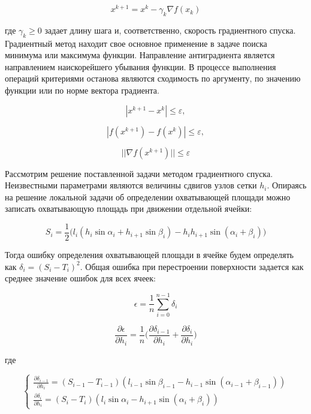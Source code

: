 \documentclass[
11pt,%
tightenlines,%
twoside,%
onecolumn,%
nofloats,%
nobibnotes,%
nofootinbib,%
superscriptaddress,%
noshowpacs,%
centertags]%
{revtex4}
\begin{document}
\begin{equation}
x^{k+1} = x^k - \gamma _k \nabla f(x_k)
\end{equation}

где $\gamma _k \geq 0$ задает длину шага и, соответственно, скорость градиентного спуска.
Градиентный метод находит свое основное применение в задаче поиска минимума или максимума функции.
Направление антиградиента является направлением наискорейшего убывания функции.
В процессе выполнения операций критериями останова являются сходимость по аргументу, по значению функции или по норме вектора градиента.

\begin{equation}
|x^{k+1} - x^k| \leq \varepsilon,
\end{equation}

\begin{equation}
|f(x^{k+1})- f(x^k)| \leq \varepsilon,
\end{equation}

\begin{equation}
||\nabla f(x^{k+1})|| \leq \varepsilon
\end{equation}


Рассмотрим решение поставленной задачи методом градиентного спуска.
Неизвестными параметрами являются величины сдвигов узлов сетки $h_i$.
Опираясь на решение локальной задачи об определении охватывающей площади можно записать охватывающую площадь при движении отдельной ячейки:

\begin{equation}
S_i = \frac{1}{2}\big(l_i(h_i \sin \alpha_i + h_{i + 1} \sin \beta_i) - h_ih_{i + 1} \sin(\alpha_i + \beta_i)\big) 
\end{equation}

Тогда ошибку определения охватывающей площади в ячейке будем определять как $\delta_i = (S_i - T_i)^2$.
Общая ошибка при перестроении поверхности задается как среднее значение ошибок для всех ячеек:

\begin{equation}
\epsilon = \frac{1}{n}\sum_{i = 0}^{n - 1}{\delta_i}
\end{equation}

\begin{equation}
\frac{\partial \epsilon}{\partial h_i} = \frac{1}{n}\big(\frac{\partial \delta_{i - 1}}{\partial h_i} + \frac{\partial \delta_i}{\partial h_i}\big)
\end{equation}

где

\begin{equation}
\begin{cases}
\frac{\partial \delta_{i - 1}}{\partial h_i} = (S_{i - 1} - T_{i - 1})(l_{i - 1} \sin \beta_{i - 1} - h_{i - 1} \sin(\alpha_{i - 1} + \beta_{i - 1})) \\
\frac{\partial \delta_i}{\partial h_i} = (S_i - T_i)(l_i \sin \alpha_i - h_{i + 1} \sin(\alpha_i + \beta_i))
\end{cases}
\end{equation}
\end{document}
